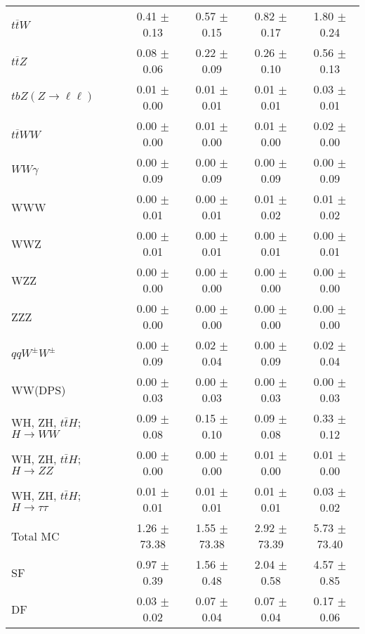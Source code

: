 \begin{tabular}{l|cccc}
                   $t\overline{t}W$ &  0.41 $\pm$  0.13 &  0.57 $\pm$  0.15 &  0.82 $\pm$  0.17 &  1.80 $\pm$  0.24 \\
                   $t\overline{t}Z$ &  0.08 $\pm$  0.06 &  0.22 $\pm$  0.09 &  0.26 $\pm$  0.10 &  0.56 $\pm$  0.13 \\
    $tbZ (Z \rightarrow \ell \ell)$ &  0.01 $\pm$  0.00 &  0.01 $\pm$  0.01 &  0.01 $\pm$  0.01 &  0.03 $\pm$  0.01 \\
                  $t\overline{t}WW$ &  0.00 $\pm$  0.00 &  0.01 $\pm$  0.00 &  0.01 $\pm$  0.00 &  0.02 $\pm$  0.00 \\
                         $WW\gamma$ &  0.00 $\pm$  0.09 &  0.00 $\pm$  0.09 &  0.00 $\pm$  0.09 &  0.00 $\pm$  0.09 \\
                                WWW &  0.00 $\pm$  0.01 &  0.00 $\pm$  0.01 &  0.01 $\pm$  0.02 &  0.01 $\pm$  0.02 \\
                                WWZ &  0.00 $\pm$  0.01 &  0.00 $\pm$  0.01 &  0.00 $\pm$  0.01 &  0.00 $\pm$  0.01 \\
                                WZZ &  0.00 $\pm$  0.00 &  0.00 $\pm$  0.00 &  0.00 $\pm$  0.00 &  0.00 $\pm$  0.00 \\
                                ZZZ &  0.00 $\pm$  0.00 &  0.00 $\pm$  0.00 &  0.00 $\pm$  0.00 &  0.00 $\pm$  0.00 \\
                 $qqW^{\pm}W^{\pm}$ &  0.00 $\pm$  0.09 &  0.02 $\pm$  0.04 &  0.00 $\pm$  0.09 &  0.02 $\pm$  0.04 \\
                            WW(DPS) &  0.00 $\pm$  0.03 &  0.00 $\pm$  0.03 &  0.00 $\pm$  0.03 &  0.00 $\pm$  0.03 \\
WH, ZH, $t\bar{t}H$; $H \rightarrow WW$ &  0.09 $\pm$  0.08 &  0.15 $\pm$  0.10 &  0.09 $\pm$  0.08 &  0.33 $\pm$  0.12 \\
WH, ZH, $t\bar{t}H$; $H \rightarrow ZZ$ &  0.00 $\pm$  0.00 &  0.00 $\pm$  0.00 &  0.01 $\pm$  0.00 &  0.01 $\pm$  0.00 \\
WH, ZH, $t\bar{t}H$; $H \rightarrow \tau\tau$ &  0.01 $\pm$  0.01 &  0.01 $\pm$  0.01 &  0.01 $\pm$  0.01 &  0.03 $\pm$  0.02 \\
\hline\hline
                           Total MC &  1.26 $\pm$ 73.38 &  1.55 $\pm$ 73.38 &  2.92 $\pm$ 73.39 &  5.73 $\pm$ 73.40 \\
\hline
                                 SF &  0.97 $\pm$  0.39 &  1.56 $\pm$  0.48 &  2.04 $\pm$  0.58 &  4.57 $\pm$  0.85 \\
                                 DF &  0.03 $\pm$  0.02 &  0.07 $\pm$  0.04 &  0.07 $\pm$  0.04 &  0.17 $\pm$  0.06 \\

\end{tabular}
